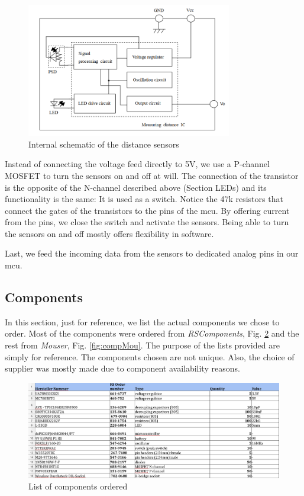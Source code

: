 \begin{figure}[htb]
    \centering
    \includegraphics[width=0.8\textwidth]{figures/hardware/sensorData.PNG}
    \caption{Internal schematic of the distance sensors}
    \label{fig:sensorsData}
\end{figure}
\FloatBarrier

Instead of connecting the voltage feed directly to 5V, we use a P-channel MOSFET to turn the sensors on and off at will. The connection of the transistor is the opposite of the N-channel described above (Section LEDs) and its functionality is the same: It is used as a switch. Notice the 47k resistors that connect the gates of the transistors to the pins of the mcu. By offering current from the pins, we close the switch and activate the sensors. Being able to turn the sensors on and off mostly offers flexibility in software.

Last, we feed the incoming data from the sensors to dedicated analog pins in our mcu.

\vspace{1cm}


\subsection{Components}

In this section, just for reference, we list the actual components we chose to order. Most of the components were ordered from \textit{RSComponents}, Fig. \ref{fig:compRS} and the rest from \textit{Mouser}, Fig. \ref{fig:compMou}. The purpose of the lists provided are simply for reference. The components chosen are not unique. Also, the choice of supplier was mostly made due to component availability reasons.

\begin{figure}[htb]
    \centering
    \includegraphics[width=1\textwidth]{figures/hardware/Components1.PNG}
    \caption{List of components ordered}
    \label{fig:compRS}
\end{figure}


